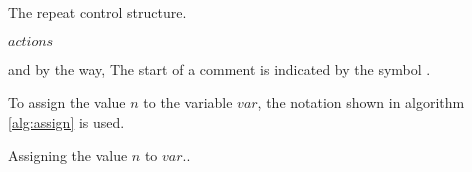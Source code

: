 \begin{algorithm}[H]
  \caption{The repeat control structure.}
  \label{alg:repeat}
  \begin{algorithmic}[1]
    \State $actions$ 
    \EndRepeatn
  \end{algorithmic}
\end{algorithm}

and by the way, The start of a comment is indicated by the symbol \commentsymbol.

To assign the value $n$ to the variable $var$, the notation shown in
algorithm \ref{alg:assign} is used.

\begin{algorithm}[H]
  \caption{Assigning the value $n$ to $var$..}
  \label{alg:assign}
  \begin{algorithmic}[1]
  \end{algorithmic}
\end{algorithm}